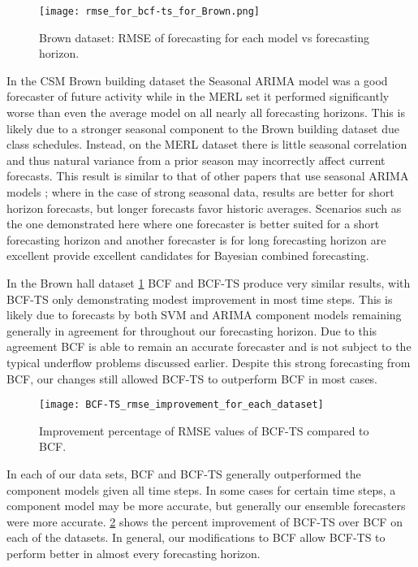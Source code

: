 \begin{figure}[h]
	\begin{center}
		\texttt{[image: rmse\_for\_bcf-ts\_for\_Brown.png]}
	\end{center}
	\caption{Brown dataset: RMSE of forecasting for each model vs forecasting horizon.}
	\label{fig:rmseplotbrown}
\end{figure}

In the CSM Brown building dataset the Seasonal ARIMA model was a good forecaster of future activity while in the MERL set it performed significantly worse than even the average model on all nearly all forecasting horizons.  This is likely due to a stronger seasonal component to the Brown building dataset due class schedules.  Instead, on the MERL dataset there is little seasonal correlation and thus natural variance from a prior season may incorrectly affect current forecasts.  This result is similar to that of other papers that use seasonal ARIMA models \cite{Newsham2010}; where in the case of strong seasonal data, results are better for short horizon forecasts, but longer forecasts favor historic averages.  Scenarios such as the one demonstrated here where one forecaster is better suited for a short forecasting horizon and another forecaster is for long forecasting horizon are excellent provide excellent candidates for Bayesian combined forecasting.

In the Brown hall dataset \ref{fig:rmseplotbrown} BCF and BCF-TS produce very similar results, with BCF-TS only demonstrating modest improvement in most time steps.  This is likely due to forecasts by both SVM and ARIMA component models remaining generally in agreement for throughout our forecasting horizon.  Due to this agreement BCF is able to remain an accurate forecaster and is not subject to the typical underflow problems discussed earlier.  Despite this strong forecasting from BCF, our changes still allowed BCF-TS to outperform BCF in most cases.

\begin{figure}[!h]
	\begin{center}
		\texttt{[image: BCF-TS\_rmse\_improvement\_for\_each\_dataset]}
	\end{center}
	\caption{Improvement percentage of RMSE values of BCF-TS compared to BCF.}
	\label{fig:bcftsrmseimprovement}
\end{figure}

In each of our data sets, BCF and BCF-TS generally outperformed the component models given all time steps.  In some cases for certain time steps, a component model may be more accurate, but generally our ensemble forecasters were more accurate.  \ref{fig:bcftsrmseimprovement} shows the percent improvement of BCF-TS over BCF on each of the datasets.  In general, our modifications to BCF allow BCF-TS to perform better in almost every forecasting horizon.  

